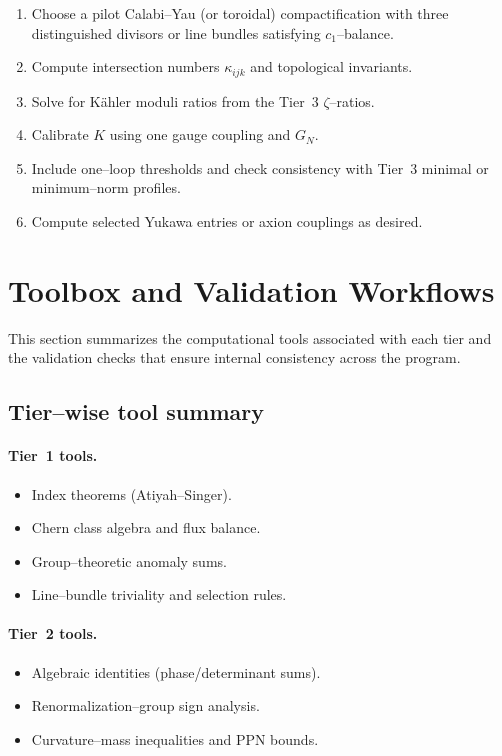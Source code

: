\documentclass[11pt]{article}
\begin{document}
\begin{enumerate}
  \item Choose a pilot Calabi--Yau (or toroidal) compactification with
        three distinguished divisors or line bundles satisfying
        $c_1$--balance.
  \item Compute intersection numbers $\kappa_{ijk}$ and topological
        invariants.
  \item Solve for K\"ahler moduli ratios from the Tier~3 $\zeta$--ratios.
  \item Calibrate $K$ using one gauge coupling and $G_N$.
  \item Include one--loop thresholds and check consistency with Tier~3
        minimal or minimum--norm profiles.
  \item Compute selected Yukawa entries or axion couplings as desired.
\end{enumerate}
\section{Toolbox and Validation Workflows}

This section summarizes the computational tools associated with each
tier and the validation checks that ensure internal consistency across
the program.

\subsection{Tier--wise tool summary}

\paragraph{Tier~1 tools.}
\begin{itemize}
  \item Index theorems (Atiyah--Singer).
  \item Chern class algebra and flux balance.
  \item Group--theoretic anomaly sums.
  \item Line--bundle triviality and selection rules.
\end{itemize}

\paragraph{Tier~2 tools.}
\begin{itemize}
  \item Algebraic identities (phase/determinant sums).
  \item Renormalization--group sign analysis.
  \item Curvature--mass inequalities and PPN bounds.
\end{itemize}
\end{document}
